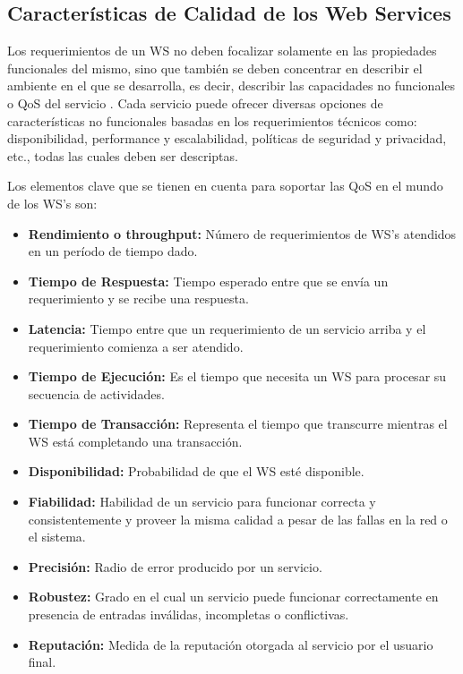 \subsection{Características de Calidad de los Web Services}
\label{Características de Calidad de los Web Services}

Los requerimientos de un WS no deben focalizar solamente en las propiedades funcionales del mismo, sino que también se deben concentrar en describir el ambiente en el que se desarrolla, es decir, describir las capacidades no funcionales o QoS del servicio \cite{W3C03-QoS}. Cada servicio puede ofrecer diversas opciones de características no funcionales basadas en los requerimientos técnicos como: disponibilidad, performance y escalabilidad, políticas de seguridad y privacidad, etc., todas las cuales deben ser descriptas.

Los elementos clave que se tienen en cuenta para soportar las QoS en el mundo de los WS's son:
\begin{itemize}
	\item \textbf{Rendimiento o throughput:} Número de requerimientos de WS's atendidos en un período de tiempo dado.
	
	\item \textbf{Tiempo de Respuesta:} Tiempo esperado entre que se envía un requerimiento y se recibe una respuesta.
	
	\item \textbf{Latencia:} Tiempo entre que un requerimiento de un servicio arriba y el requerimiento comienza a ser atendido.
	
	\item \textbf{Tiempo de Ejecución:} Es el tiempo que necesita un WS para procesar su secuencia de actividades.
	
	\item \textbf{Tiempo de Transacción:} Representa el tiempo que transcurre mientras el WS está completando una transacción.
	
	\item \textbf{Disponibilidad:} Probabilidad de que el WS esté disponible.
	
	\item \textbf{Fiabilidad:} Habilidad de un servicio para funcionar correcta y consistentemente y proveer la misma calidad a pesar de las fallas en la red o el sistema.
	
	\item \textbf{Precisión:} Radio de error producido por un servicio.
	
	\item \textbf{Robustez:} Grado en el cual un servicio puede funcionar correctamente en presencia de entradas inválidas, incompletas o conflictivas.
	
	\item \textbf{Reputación:} Medida de la reputación otorgada al servicio por el usuario final.
	
\end{itemize}

